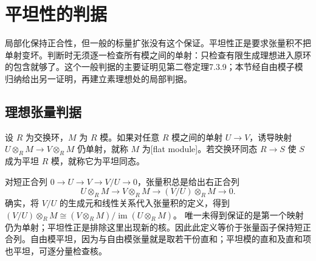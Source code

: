 
\section{平坦性的判据}\label{b3:sec:1201}

局部化保持正合性，但一般的标量扩张没有这个保证。平坦性正是要求张量积不把单射变坏。判断时无须逐一检查所有模之间的单射：只检查有限生成理想进入原环的包含就够了。这个一般判据的主要证明见第二卷定理7.3.9；本节经自由模子模归纳给出另一证明，再建立素理想处的局部判据。

\subsection{理想张量判据}\label{b3:subsec:1201:01}

\begin{definition}\label{b3:def:flat-module}
	设 \(R\) 为交换环，\(M\) 为 \(R\) 模。如果对任意 \(R\) 模之间的单射 \(U\to V\)，诱导映射 \(U\otimes_RM\to V\otimes_RM\) 仍单射，就称 \(M\) 为[flat module]。若交换环同态 \(R\to S\) 使 \(S\) 成为平坦 \(R\) 模，就称它为平坦同态。
\end{definition}

对短正合列 \(0\to U\to V\to V/U\to0\)，张量积总是给出右正合列
\[
	U\otimes_RM\longrightarrow V\otimes_RM \longrightarrow(V/U)\otimes_RM\longrightarrow0.
\]
确实，将 \(V/U\) 的生成元和线性关系代入张量积的定义，得到 \((V/U)\otimes_RM\cong(V\otimes_RM)/\operatorname{im}(U\otimes_RM)\)。 唯一未得到保证的是第一个映射仍为单射；平坦性正是排除这里出现新的核。因此此定义等价于张量函子保持短正合列。自由模平坦，因为与自由模张量就是取若干份直和；平坦模的直和及直和项也平坦，可逐分量检查核。

